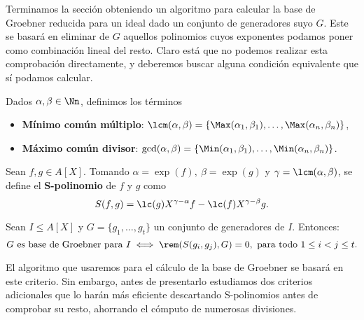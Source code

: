 Terminamos la sección obteniendo un algoritmo para calcular la base de Groebner reducida para un ideal dado un conjunto de generadores suyo $G$. Este se basará en eliminar de $G$ aquellos polinomios cuyos exponentes podamos poner como combinación lineal del resto. Claro está que no podemos realizar esta comprobación directamente, y deberemos buscar alguna condición equivalente que sí podamos calcular.

\begin{definicion}
    Dados $\alpha,\beta \in \Nn$, definimos los términos
    \begin{itemize}
        \item \textbf{Mínimo común múltiplo}: $\lcm(\alpha,\beta) = \{\Max(\alpha_1, \beta_1),\dots, \Max(\alpha_n, \beta_n)\}$,
        \item \textbf{Máximo común divisor}: $\gcd(\alpha,\beta) = \{\Min(\alpha_1, \beta_1),\dots, \Min(\alpha_n, \beta_n)\}$.
    \end{itemize}
\end{definicion}

\begin{definicion}
    Sean $f,g \in A[X]$. Tomando $\alpha=\exp(f),\ \beta=\exp(g)$ y $\gamma = \lcm(\alpha,\beta)$, se define el \textbf{S-polinomio} de $f$ y $g$ como
    \begin{equation*}
        S(f,g) = \lc(g)X^{\gamma-\alpha}f - \lc(f)X^{\gamma-\beta}g.
    \end{equation*}
\end{definicion}

\begin{teorema}\label{t:criterio}
    Sean $I\le A[X]$ y $G=\{g_1,\dots, g_t\}$ un conjunto de generadores de $I$. Entonces:
    \begin{equation*}
        G \text{ es base de Groebner para } I \iff \rem(S(g_i,g_j), G)=0,\ \text{para todo } 1\le i<j\le t.
    \end{equation*}
\end{teorema}

El algoritmo que usaremos para el cálculo de la base de Groebner se basará en este criterio. Sin embargo, antes de presentarlo estudiamos dos criterios adicionales \cite{criterio1,criterio2} que lo harán más eficiente descartando S-polinomios antes de comprobar su resto, ahorrando el cómputo de numerosas divisiones.

